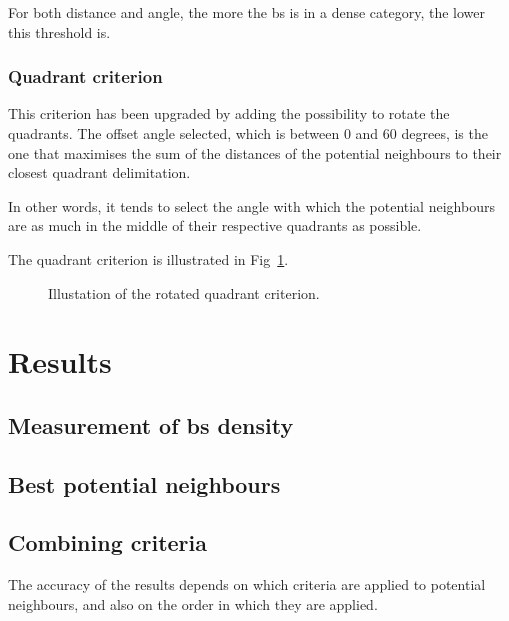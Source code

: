 \documentclass[lettersize,journal,english]{IEEEtran}
\begin{document}
            For both distance and angle, the more the \acrshort{bs} is in a dense category, the lower this threshold is.

        \subsubsection{Quadrant criterion}
            This criterion has been upgraded by adding the possibility to rotate the quadrants. The offset angle selected, which is between $0$ and $60$ degrees, is the one that maximises the sum of the distances of the potential neighbours to their closest quadrant delimitation.

            In other words, it tends to select the angle with which the potential neighbours are as much in the middle of their respective quadrants as possible.

            The quadrant criterion is illustrated in Fig~\ref{fig:crit_qua}.
            \begin{figure}
                \centering
                \caption{Illustation of the rotated quadrant criterion.}
                \label{fig:crit_qua}
            \end{figure}

\section{Results\label{sec:res}}
    \subsection{Measurement of \acrshort{bs} density}

    \subsection{Best potential neighbours}
        
    \subsection{Combining criteria}
        The accuracy of the results depends on which criteria are applied to potential neighbours, and also on the order in which they are applied.
\end{document}
